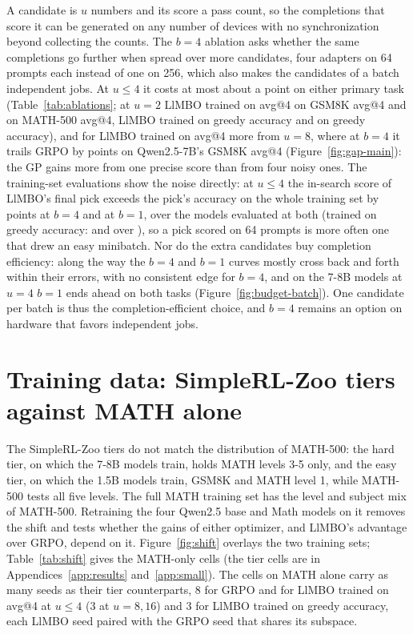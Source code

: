 \documentclass[twoside]{article}
\newcommand{\llmbo}{LlMBO}
\begin{document}
A candidate is $u$ numbers and its score a pass count, so the completions that score it can be generated on any number of devices with no synchronization beyond collecting the counts. The $b = 4$ ablation asks whether the same completions go further when spread over more candidates, four adapters on 64 prompts each instead of one on 256, which also makes the candidates of a batch independent jobs. At $u \le 4$ it costs at most about a point on either primary task (Table~\ref{tab:ablations}; at $u = 2$ \llmbo{} trained on avg@4 \batchFourToneMeanUTwoGsm{} on GSM8K avg@4 and \batchFourToneMeanUTwoMathFive{} on MATH-500 avg@4, \llmbo{} trained on greedy accuracy \batchFourGreedyGreedyUTwoGsm{} and \batchFourGreedyGreedyUTwoMathFive{} on greedy accuracy), and for \llmbo{} trained on avg@4 more from $u = 8$, where at $b = 4$ it trails GRPO by \gapBFourToneMeanQwenUEightGsm{} points on Qwen2.5-7B's GSM8K avg@4 (Figure~\ref{fig:gap-main}): the GP gains more from one precise score than from four noisy ones. The training-set evaluations show the noise directly: at $u \le 4$ the in-search score of \llmbo{}'s final pick exceeds the pick's accuracy on the whole training set by \searchBiasBFourTone{} points at $b = 4$ and \searchBiasTone{} at $b = 1$, over the \searchBiasModelsTone{} models evaluated at both (trained on greedy accuracy: \searchBiasBFourGreedy{} and \searchBiasGreedy{} over \searchBiasModelsGreedy{}), so a pick scored on 64 prompts is more often one that drew an easy minibatch. Nor do the extra candidates buy completion efficiency: along the way the $b = 4$ and $b = 1$ curves mostly cross back and forth within their errors, with no consistent edge for $b = 4$, and on the 7-8B models at $u = 4$ $b = 1$ ends ahead on both tasks (Figure~\ref{fig:budget-batch}). One candidate per batch is thus the completion-efficient choice, and $b = 4$ remains an option on hardware that favors independent jobs.

\FloatBarrier
\clearpage
\section{Training data: SimpleRL-Zoo tiers against MATH alone}
\label{app:shift}
The SimpleRL-Zoo tiers do not match the distribution of MATH-500: the hard tier, on which the 7-8B models train, holds MATH levels 3-5 only, and the easy tier, on which the 1.5B models train, GSM8K and MATH level 1, while MATH-500 tests all five levels. The full MATH training set has the level and subject mix of MATH-500. Retraining the four Qwen2.5 base and Math models on it removes the shift and tests whether the gains of either optimizer, and \llmbo{}'s advantage over GRPO, depend on it. Figure~\ref{fig:shift} overlays the two training sets; Table~\ref{tab:shift} gives the MATH-only cells (the tier cells are in Appendices~\ref{app:results} and~\ref{app:small}). The cells on MATH alone carry as many seeds as their tier counterparts, 8 for GRPO and for \llmbo{} trained on avg@4 at $u \le 4$ (3 at $u = 8, 16$) and 3 for \llmbo{} trained on greedy accuracy, each \llmbo{} seed paired with the GRPO seed that shares its subspace.
\end{document}
